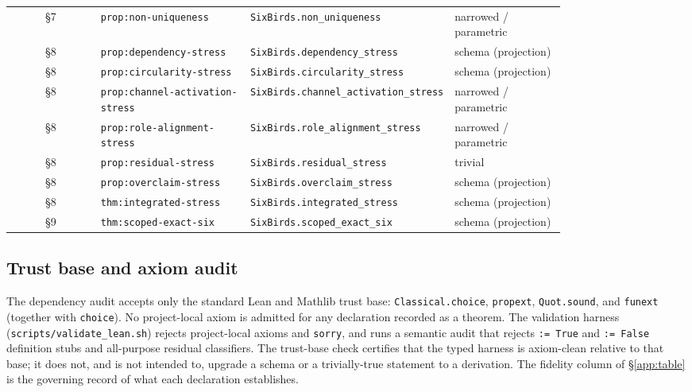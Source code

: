 \documentclass[11pt]{article}
\theoremstyle{definition}
\begin{document}
{\begin{longtable}{@{}c >{\raggedright\arraybackslash}p{0.27\linewidth} >{\raggedright\arraybackslash}p{0.34\linewidth} >{\raggedright\arraybackslash}p{0.20\linewidth}@{}}
§7 & \texttt{prop:\allowbreak non-\allowbreak uniqueness} & \texttt{SixBirds.\allowbreak non\_\allowbreak uniqueness} & narrowed / parametric \\
§8 & \texttt{prop:\allowbreak dependency-\allowbreak stress} & \texttt{SixBirds.\allowbreak dependency\_\allowbreak stress} & schema (projection) \\
§8 & \texttt{prop:\allowbreak circularity-\allowbreak stress} & \texttt{SixBirds.\allowbreak circularity\_\allowbreak stress} & schema (projection) \\
§8 & \texttt{prop:\allowbreak channel-\allowbreak activation-\allowbreak stress} & \texttt{SixBirds.\allowbreak channel\_\allowbreak activation\_\allowbreak stress} & narrowed / parametric \\
§8 & \texttt{prop:\allowbreak role-\allowbreak alignment-\allowbreak stress} & \texttt{SixBirds.\allowbreak role\_\allowbreak alignment\_\allowbreak stress} & narrowed / parametric \\
§8 & \texttt{prop:\allowbreak residual-\allowbreak stress} & \texttt{SixBirds.\allowbreak residual\_\allowbreak stress} & trivial \\
§8 & \texttt{prop:\allowbreak overclaim-\allowbreak stress} & \texttt{SixBirds.\allowbreak overclaim\_\allowbreak stress} & schema (projection) \\
§8 & \texttt{thm:\allowbreak integrated-\allowbreak stress} & \texttt{SixBirds.\allowbreak integrated\_\allowbreak stress} & schema (projection) \\
§9 & \texttt{thm:\allowbreak scoped-\allowbreak exact-\allowbreak six} & \texttt{SixBirds.\allowbreak scoped\_\allowbreak exact\_\allowbreak six} & schema (projection) \\
\bottomrule
\end{longtable}
}

\subsection{Trust base and axiom audit}\label{app:trust-base}

The dependency audit accepts only the standard Lean and Mathlib trust base:
\texttt{Classical.choice}, \texttt{propext}, \texttt{Quot.sound}, and
\texttt{funext} (together with \texttt{choice}). No project-local axiom is
admitted for any declaration recorded as a theorem. The validation harness
(\texttt{scripts/validate\_lean.sh}) rejects project-local axioms and
\texttt{sorry}, and runs a semantic audit that rejects \texttt{:= True} and
\texttt{:= False} definition stubs and all-purpose residual classifiers. The
trust-base check certifies that the typed harness is axiom-clean relative to that
base; it does not, and is not intended to, upgrade a schema or a trivially-true
statement to a derivation. The fidelity column of \S\ref{app:table} is the
governing record of what each declaration establishes.
 
\end{document}
